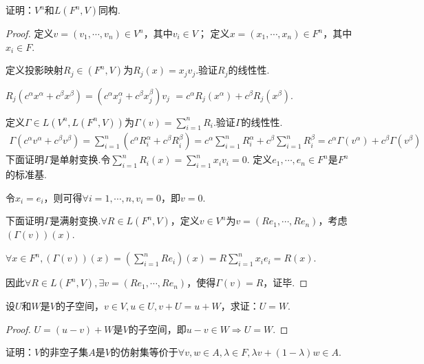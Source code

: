 \newpage

\begin{problem}[6]\label{3.E.6}
    证明：\(V^n\)和\(L(F^n,V)\)同构.    
\end{problem}

\begin{proof}
    定义\(v=(v_1,\cdots,v_n) \in V^n\)，其中\(v_i \in V\)；
    定义\(x=(x_1,\cdots,x_n) \in F^n\)，其中\(x_i \in F\).
    
    定义投影映射\(R_j \in (F^n,V)\)为\(R_j(x)=x_jv_j\).验证\(R_j\)的线性性.
    
    \(R_j(c^\alpha x^\alpha+c^\beta x^\beta)=(c^\alpha x_j^\alpha+c^\beta x_j^\beta)v_j\)
    \(=c^\alpha R_j(x^\alpha)+c^\beta R_j(x^\beta)\).
    
    定义\(\Gamma \in L(V^n,L(F^n,V))\)为\(\Gamma(v)=\sum_{i=1}^n R_i\).验证\(\Gamma\)的线性性.
    \begin{align*}
        \Gamma(c^\alpha v^\alpha+c^\beta v^\beta)
        =\sum_{i=1}^n (c^\alpha R_i^\alpha+c^\beta R_i^\beta)
        =c^\alpha \sum_{i=1}^n R_i^\alpha+c^\beta \sum_{i=1}^n R_i^\beta
        =c^\alpha \Gamma(v^\alpha)+c^\beta \Gamma(v^\beta)
    \end{align*}
    下面证明\(\Gamma\)是单射变换.令\(\sum_{i=1}^n R_i(x)=\sum_{i=1}^n x_iv_i=0\).
    定义\(e_1,\cdots,e_n \in F^n\)是\(F^n\)的标准基.
    
    令\(x_i=e_i\)，则可得\(\forall i=1,\cdots,n,v_i=0\)，即\(v=0\).
    
    下面证明\(\Gamma\)是满射变换.\(\forall R \in L(F^n,V)\)，定义\(v \in V^n\)为\(v=(Re_1,\cdots,Re_n)\)，考虑\((\Gamma(v))(x)\).
    
    \(\forall x \in F^n,(\Gamma(v))(x)=(\sum_{i=1}^n Re_i)(x)=R\sum_{i=1}^n x_ie_i=R(x)\).
    
    因此\(\forall R \in L(F^n,V),\exists v=(Re_1,\cdots,Re_n)\)，使得\(\Gamma(v)=R\)，证毕.    
\end{proof}

\begin{problem}[7]\label{3.E.7}
    设\(U\)和\(W\)是\(V\)的子空间，\(v \in V,u \in U,v+U=u+W\)，求证：\(U=W\).
\end{problem}

\begin{proof}
    \(U=(u-v)+W\)是\(V\)的子空间，即\(u-v \in W \Rightarrow U=W\).
\end{proof}

\begin{problem}[8]\label{3.E.8}
    证明：\(V\)的非空子集\(A\)是\(V\)的仿射集等价于\(\forall v,w \in A,\lambda \in F,\lambda v+(1-\lambda)w \in A\).
\end{problem}

